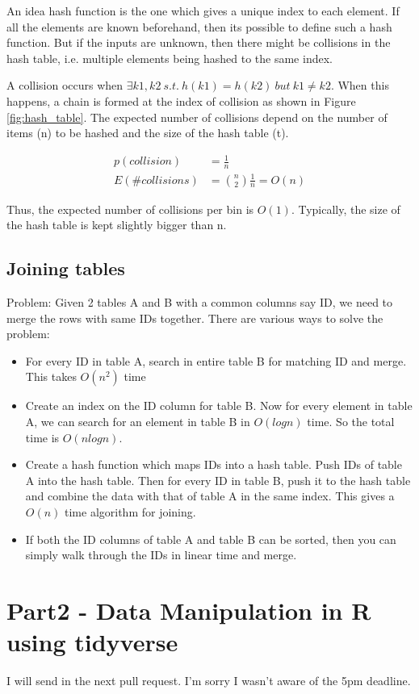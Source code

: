 An idea hash function is the one which gives a unique index to each element. If all the elements are known beforehand, then its possible to define such a hash function. But if the inputs are unknown, then there might be collisions in the hash table, i.e. multiple elements being hashed to the same index.

A collision occurs when $\exists k1,k2\ s.t.\ h(k1)=h(k2)\ but\ k1 \ne k2$. When this happens, a chain is formed at the index of collision as shown in Figure \ref{fig:hash_table}. The expected number of collisions depend on the number of items (n) to be hashed and the size of the hash table (t). 

\begin{align*}
    p(collision) &= \frac{1}{n} \\
    E(\#collisions) &= \binom{n}{2} \frac{1}{n} = O(n)
\end{align*}

Thus, the expected number of collisions per bin is $O(1)$. Typically, the size of the hash table is kept slightly bigger than n.

\subsection{Joining tables}

Problem: Given 2 tables A and B with a common columns say ID, we need to merge the rows with same IDs together. There are various ways to solve the problem:

\begin{itemize}
    \item For every ID in table A, search in entire table B for matching ID and merge. This takes $O(n^2)$ time
    \item Create an index on the ID column for table B. Now for every element in table A, we can search for an element in table B in $O(logn)$ time. So the total time is $O(nlogn)$.
    \item Create a hash function which maps IDs into a hash table. Push IDs of table A into the hash table. Then for every ID in table B, push it to the hash table and combine the data with that of table A in the same index. This gives a $O(n)$ time algorithm for joining.
    \item If both the ID columns of table A and table B can be sorted, then you can simply walk through the IDs in linear time and merge.
\end{itemize}

\section*{Part2 - Data Manipulation in R using tidyverse}

I will send in the next pull request. I'm sorry I wasn't aware of the 5pm deadline.
